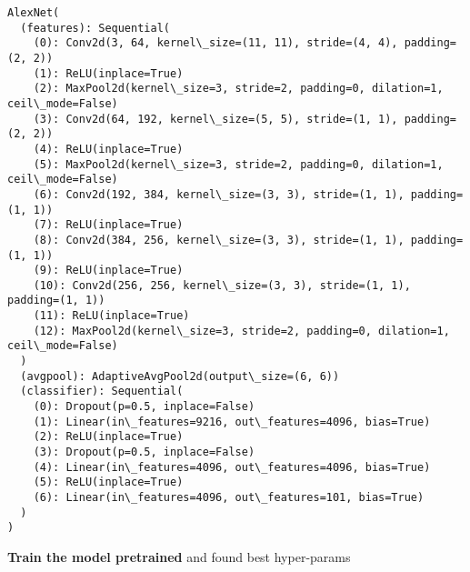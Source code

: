 \documentclass[11pt]{article}
\begin{document}
    \begin{Verbatim}[commandchars=\\\{\}]
AlexNet(
  (features): Sequential(
    (0): Conv2d(3, 64, kernel\_size=(11, 11), stride=(4, 4), padding=(2, 2))
    (1): ReLU(inplace=True)
    (2): MaxPool2d(kernel\_size=3, stride=2, padding=0, dilation=1,
ceil\_mode=False)
    (3): Conv2d(64, 192, kernel\_size=(5, 5), stride=(1, 1), padding=(2, 2))
    (4): ReLU(inplace=True)
    (5): MaxPool2d(kernel\_size=3, stride=2, padding=0, dilation=1,
ceil\_mode=False)
    (6): Conv2d(192, 384, kernel\_size=(3, 3), stride=(1, 1), padding=(1, 1))
    (7): ReLU(inplace=True)
    (8): Conv2d(384, 256, kernel\_size=(3, 3), stride=(1, 1), padding=(1, 1))
    (9): ReLU(inplace=True)
    (10): Conv2d(256, 256, kernel\_size=(3, 3), stride=(1, 1), padding=(1, 1))
    (11): ReLU(inplace=True)
    (12): MaxPool2d(kernel\_size=3, stride=2, padding=0, dilation=1,
ceil\_mode=False)
  )
  (avgpool): AdaptiveAvgPool2d(output\_size=(6, 6))
  (classifier): Sequential(
    (0): Dropout(p=0.5, inplace=False)
    (1): Linear(in\_features=9216, out\_features=4096, bias=True)
    (2): ReLU(inplace=True)
    (3): Dropout(p=0.5, inplace=False)
    (4): Linear(in\_features=4096, out\_features=4096, bias=True)
    (5): ReLU(inplace=True)
    (6): Linear(in\_features=4096, out\_features=101, bias=True)
  )
)
\end{Verbatim}

    \textbf{Train the model pretrained} and found best hyper-params
\end{document}
